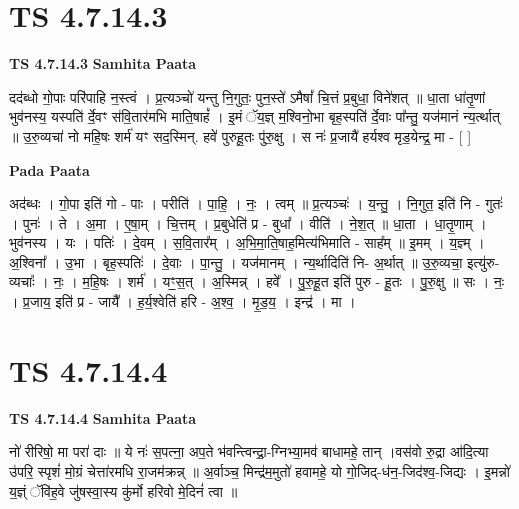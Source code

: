 \documentclass[17pt]{extarticle}
\begin{document}

\section{ TS 4.7.14.3 }

\textbf{TS 4.7.14.3 } \newline
\textbf{Samhita Paata} \newline

दद॑ब्धो गो॒पाः परि॑पाहि न॒स्त्वं । प्र॒त्यञ्चो॑ यन्तु नि॒गुतः॒ पुन॒स्ते॑ ऽमैषां᳚ चि॒त्तं प्र॒बुधा॒ विने॑शत् ॥ धा॒ता धा॑तृ॒णां भुव॑नस्य॒ यस्पति॑ र्दे॒वꣳ स॑वि॒तार॑मभि माति॒षाहं᳚ । इ॒मं ॅय॒ज्ञ् म॒श्विनो॒भा बृह॒स्पति॑ र्दे॒वाः पा᳚न्तु॒ यज॑मानं न्य॒र्त्थात् ॥ उ॒रु॒व्यचा॑ नो महि॒षः शर्म॑ यꣳ सद॒स्मिन्. हवे॑ पुरुहू॒तः पु॑रु॒क्षु । स नः॑ प्र॒जायै॑ हर्यश्व मृड॒येन्द्र॒ मा - [  ] \newline

\textbf{Pada Paata} \newline

अद॑ब्धः । गो॒पा इति॑ गो - पाः । परीति॑ । पा॒हि॒ । नः॒ । त्वम् ॥ प्र॒त्यञ्चः॑ । य॒न्तु॒ । नि॒गुत॒ इति॑ नि - गुतः॑ । पुनः॑ । ते । अ॒मा । ए॒षा॒म् । चि॒त्तम् । प्र॒बुधेति॑ प्र - बुधा᳚ । वीति॑ । ने॒श॒त् ॥ धा॒ता । धा॒तृ॒णाम् । भुव॑नस्य । यः । पतिः॑ । दे॒वम् । स॒वि॒तार᳚म् । अ॒भि॒मा॒ति॒षाह॒मित्य॑भिमाति - साह᳚म् ॥ इ॒मम् । य॒ज्ञ्म् । अ॒श्विना᳚ । उ॒भा । बृह॒स्पतिः॑ । दे॒वाः । पा॒न्तु॒ । यज॑मानम् । न्य॒र्थादिति॑ नि- अ॒र्थात् ॥ उ॒रु॒व्यचा॒ इत्यु॑रु-व्यचाः᳚ । नः॒ । म॒हि॒षः । शर्म॑ । यꣳ॒॒स॒त् । अ॒स्मिन्न् । हवे᳚ । पु॒रु॒हू॒त इति॑ पुरु - हू॒तः । पु॒रु॒क्षु ॥ सः । नः॒ । प्र॒जाय॒ इति॑ प्र - जायै᳚ । ह॒र्य॒श्वेति॑ हरि - अ॒श्व॒ । मृ॒ड॒य॒ । इन्द्र॑ । मा ।  \newline





\section{ TS 4.7.14.4 }

\textbf{TS 4.7.14.4 } \newline
\textbf{Samhita Paata} \newline

नो॑ रीरिषो॒ मा परा॑ दाः ॥ ये नः॑ स॒पत्ना॒ अप॒ते भ॑वन्त्विन्द्रा॒-ग्निभ्या॒मव॑ बाधामहे॒ तान् ।वस॑वो रु॒द्रा आ॑दि॒त्या उ॑परि॒ स्पृशं॑ मो॒ग्रं चेत्ता॑रमधि रा॒जम॑क्रन्न् ॥ अ॒र्वाञ्च॒ मिन्द्र॑म॒मुतो॑ हवामहे॒ यो गो॒जिद्-ध॑न॒-जिद॑श्व॒-जिद्यः । इ॒मन्नो॑ य॒ज्ञ्ं ॅवि॑ह॒वे जु॑षस्वा॒स्य कु॑र्मो हरिवो मे॒दिनं॑ त्वा ॥ \newline
\end{document}
